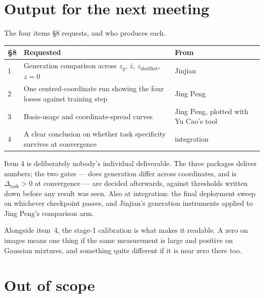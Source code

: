 \documentclass[11pt]{article}
\newcommand{\dtask}{\Delta_{\mathrm{task}}}
\begin{document}
\section{Output for the next meeting}\label{sec:meeting}

The four items \S8 requests, and who produces each.

\vspace{0.4em}
\noindent
\begin{tabularx}{\textwidth}{@{}l X l@{}}
\toprule
\textbf{\S8} & \textbf{Requested} & \textbf{From} \\
\midrule
1 & Generation comparison across $z_y$, $\bar z$, $z_{\mathrm{shuffled}}$, $z = 0$ & Jinjian \\
2 & One centred-coordinate run showing the four losses against training step & Jing Peng \\
3 & Basis-usage and coordinate-spread curves & Jing Peng, plotted with Yu Cao's tool \\
4 & A clear conclusion on whether task specificity survives at convergence & integration \\
\bottomrule
\end{tabularx}

\vspace{0.6em}
\noindent
Item 4 is deliberately nobody's individual deliverable. The three packages deliver
numbers; the two gates --- does generation differ across coordinates, and is
$\dtask > 0$ at convergence --- are decided afterwards, against thresholds written down
before any result was seen. Also at integration: the final deployment sweep on whichever
checkpoint passes, and Jinjian's generation instruments applied to Jing Peng's comparison
arm.

Alongside item~4, the stage-1 calibration is what makes it readable. A zero on images
means one thing if the same measurement is large and positive on Gaussian mixtures, and
something quite different if it is near zero there too.

\section{Out of scope}\label{sec:scope}
\end{document}
